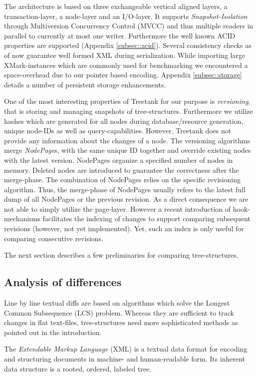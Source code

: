 The architecture is based on three exchangeable vertical aligned layers, a transaction-layer, a node-layer and an I/O-layer. It supports \emph{Snapshot-Isolation} through Multiversion Concurrency Control (MVCC) and thus multiple readers in parallel to currently at most one writer. Furthermore the well known ACID properties are supported (Appendix \ref{subsec::acid}). Several consistency checks as of now guarantee well formed XML during serialization. While importing large XMark-instances \cite{XMark} which are commonly used for benchmarking we encountered a space-overhead due to our pointer based encoding. Appendix \ref{subsec::storage} details a number of persistent storage enhancements.

One of the most interesting properties of Treetank for our purpose is \emph{versioning}, that is storing and managing snapshots of tree-structures. Furthermore we utilize hashes which are generated for all nodes during database/resource generation, unique node-IDs as well as query-capabilities. However, Treetank does not provide any information about the changes of a node. The versioning algorithms merge \emph{NodePage}s, with the same unique ID together and override existing nodes with the latest version. NodePages organize a specified number of nodes in memory. Deleted nodes are introduced to guarantee the correctness after the merge-phase. The combination of NodePages relies on the specific revisioning algorithm. Thus, the merge-phase of NodePages usually refers to the latest full dump of all NodePages or the previous revision. As a direct consequence we are not able to simply utilize the page-layer. However a recent introduction of hook-mechanisms facilitates the indexing of changes to support comparing subsequent revisions (however, not yet implemented). Yet, such an index is only useful for comparing consecutive revisions.

The next section describes a few preliminaries for comparing tree-structures.

\subsection{Analysis of differences}
Line by line textual diffs are based on algorithms which solve the Longest Common Subsequence (LCS) problem. Whereas they are sufficient to track changes in flat text-files, tree-structures need more sophisticated methods as pointed out in the introduction.

The \emph{Extendable Markup Language} (XML) is a textual data format for encoding and structuring documents in machine- and human-readable form. Its inherent data structure is a rooted, ordered, labeled tree. 

